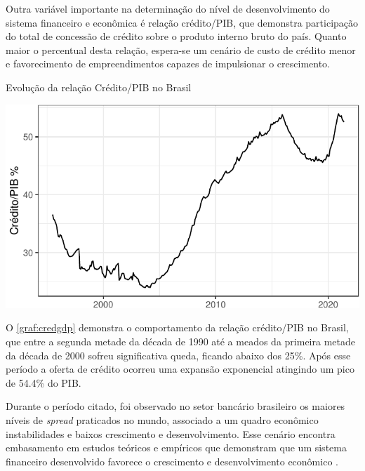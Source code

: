 \documentclass[
  12pt,
  12pt,
  openright,
  oneside,
  a4paper,
  chapter=TITLE,
  section=TITLE,
  subsection=TITLE,
  subsubsection=TITLE,
  english,
  portugues,
  sumario=tradicional]{abntex2}
\begin{document}
Outra variável importante na determinação do nível de desenvolvimento do sistema financeiro e econômica é relação crédito/PIB, que demonstra participação do total de concessão de crédito sobre o produto interno bruto do país. Quanto maior o percentual desta relação, espera-se um cenário de custo de crédito menor e favorecimento de empreendimentos capazes de impulsionar o crescimento.

\begin{grafico}[!htb]
\vspace{20pt}
\caption{Evolução da relação Crédito/PIB no Brasil}
\vspace{-4mm}

\begin{center}\includegraphics{12-exportedfigures/credit.gdp-1} \end{center}
\vspace{-3mm}
\label{graf:credgdp}
\vspace{-2mm}
\end{grafico}

O \autoref{graf:credgdp} demonstra o comportamento da relação crédito/PIB no Brasil, que entre a segunda metade da década de 1990 até a meados da primeira metade da década de 2000 sofreu significativa queda, ficando abaixo dos 25\%. Após esse período a oferta de crédito ocorreu uma expansão exponencial atingindo um pico de 54.4\% do PIB.

Durante o período citado, foi observado no setor bancário brasileiro os maiores níveis de \emph{spread} praticados no mundo, associado a um quadro econômico instabilidades e baixos crescimento e desenvolvimento. Esse cenário encontra embasamento em estudos teóricos e empíricos que demonstram que um sistema financeiro desenvolvido favorece o crescimento e desenvolvimento econômico \cite{levine:1997, matos:2003}.
\end{document}
